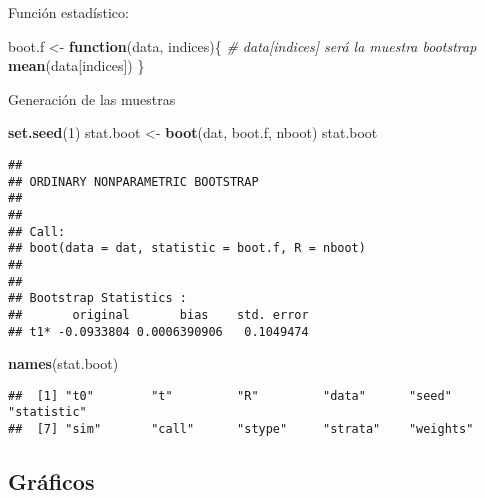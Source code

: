 \documentclass[
]{book}
\newenvironment{Shaded}{\begin{snugshade}}{\end{snugshade}}
\newcommand{\CommentTok}[1]{\textcolor[rgb]{0.56,0.35,0.01}{\textit{#1}}}
\newcommand{\ControlFlowTok}[1]{\textcolor[rgb]{0.13,0.29,0.53}{\textbf{#1}}}
\newcommand{\DataTypeTok}[1]{\textcolor[rgb]{0.13,0.29,0.53}{#1}}
\newcommand{\DecValTok}[1]{\textcolor[rgb]{0.00,0.00,0.81}{#1}}
\newcommand{\KeywordTok}[1]{\textcolor[rgb]{0.13,0.29,0.53}{\textbf{#1}}}
\newcommand{\NormalTok}[1]{#1}
\newcommand{\OperatorTok}[1]{\textcolor[rgb]{0.81,0.36,0.00}{\textbf{#1}}}
\newcommand{\OtherTok}[1]{\textcolor[rgb]{0.56,0.35,0.01}{#1}}
\newcommand{\StringTok}[1]{\textcolor[rgb]{0.31,0.60,0.02}{#1}}
\theoremstyle{break}
\theoremstyle{definition}
\theoremstyle{definition}
\theoremstyle{definition}
\theoremstyle{remark}
\begin{document}
Función estadístico:

\begin{Shaded}
\begin{Highlighting}[]
\NormalTok{boot.f <-}\StringTok{ }\ControlFlowTok{function}\NormalTok{(data, indices)\{}
  \CommentTok{# data[indices] será la muestra bootstrap}
  \KeywordTok{mean}\NormalTok{(data[indices])}
\NormalTok{\}}
\end{Highlighting}
\end{Shaded}

Generación de las muestras

\begin{Shaded}
\begin{Highlighting}[]
\KeywordTok{set.seed}\NormalTok{(}\DecValTok{1}\NormalTok{)}
\NormalTok{stat.boot <-}\StringTok{ }\KeywordTok{boot}\NormalTok{(dat, boot.f, nboot)}
\NormalTok{stat.boot}
\end{Highlighting}
\end{Shaded}

\begin{verbatim}
## 
## ORDINARY NONPARAMETRIC BOOTSTRAP
## 
## 
## Call:
## boot(data = dat, statistic = boot.f, R = nboot)
## 
## 
## Bootstrap Statistics :
##       original       bias    std. error
## t1* -0.0933804 0.0006390906   0.1049474
\end{verbatim}

\begin{Shaded}
\begin{Highlighting}[]
\KeywordTok{names}\NormalTok{(stat.boot)}
\end{Highlighting}
\end{Shaded}

\begin{verbatim}
##  [1] "t0"        "t"         "R"         "data"      "seed"      "statistic"
##  [7] "sim"       "call"      "stype"     "strata"    "weights"
\end{verbatim}

\hypertarget{gruxe1ficos}{%
\subsection{Gráficos}\label{gruxe1ficos}}

\begin{Shaded}
\end{Shaded}
\end{document}
